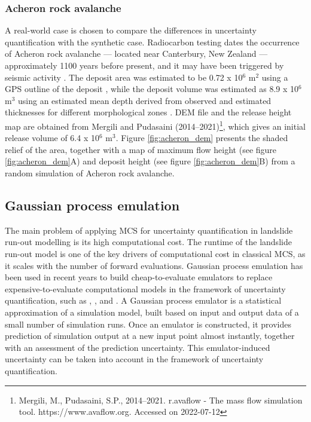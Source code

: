 \documentclass[utf8]{FrontiersinHarvard}
\begin{document}
\subsubsection{Acheron rock avalanche}

A real-world case is chosen to compare the differences in uncertainty quantification with the synthetic case. Radiocarbon testing dates the occurrence of Acheron rock avalanche --- located near Canterbury, New Zealand --- approximately 1100 years before present, and it may have been triggered by seismic activity \citep{Smith2006}. The deposit area was estimated to be 0.72 x 10$^6$ m$^2$ using a GPS outline of the deposit , while the deposit volume was estimated as 8.9 x 10$^6$ m$^3$ using an estimated mean depth derived from observed and estimated thicknesses for different morphological zones \citep{Smith2012}. DEM file and the release height map are obtained from Mergili and Pudasaini (2014--2021)\footnote{Mergili, M., Pudasaini, S.P., 2014--2021. r.avaflow - The mass flow simulation tool. https://www.avaflow.org. Accessed on 2022-07-12}, which gives an initial release volume of 6.4 x 10$^6$ m$^3$. Figure \ref{fig:acheron_dem} presents the shaded relief of the area, together with a map of maximum flow height (see figure \ref{fig:acheron_dem}A) and deposit height (see figure \ref{fig:acheron_dem}B) from a random simulation of Acheron rock avalanche.

\subsection{Gaussian process emulation}
\label{sec:method_GP}

The main problem of applying MCS for uncertainty quantification in landslide run-out modelling is its high computational cost. The runtime of the landslide run-out model is one of the key drivers of computational cost in classical MCS, as it scales with the number of forward evaluations. 
Gaussian process emulation has been used in recent years to build cheap-to-evaluate emulators to replace expensive-to-evaluate computational models in the framework of uncertainty quantification, such as \citet{Sun2021b}, \citet{Zeng2021}, and \citet{Zhao2022}. A Gaussian process emulator is a statistical approximation of a simulation model, built based on input and output data of a small number of simulation runs. Once an emulator is constructed, it provides prediction of simulation output at a new input point almost instantly, together with an assessment of the prediction uncertainty. This emulator-induced uncertainty can be taken into account in the framework of uncertainty quantification.
\end{document}
